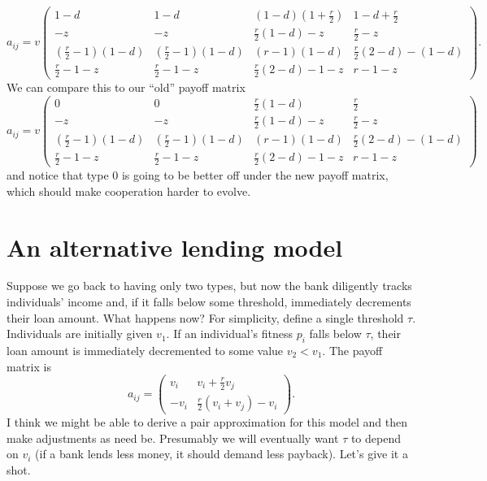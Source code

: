 \documentclass[13pt]{amsart}
\begin{document}
\begin{equation}
    a_{ij} = v
    \begin{pmatrix}
        1-d & 1-d & (1-d)(1+\frac{r}{2}) & 1-d + \frac{r}{2} \\
        -z & -z & \frac{r}{2}(1-d) -z & \frac{r}{2} -z \\
        (\frac{r}{2} - 1)(1-d) & (\frac{r}{2} - 1)(1-d) & (r-1)(1-d)& \frac{r}{2}(2 - d) - (1-d)\\
        \frac{r}{2} - 1 - z & \frac{r}{2} - 1 - z & \frac{r}{2}(2 - d) - 1 - z & r - 1 -z
    \end{pmatrix}.
\end{equation}
We can compare this to our ``old'' payoff matrix \begin{equation}
    a_{ij} = v
    \begin{pmatrix}
        0 & 0 & \frac{r}{2}(1-d) & \frac{r}{2} \\
        -z & -z & \frac{r}{2}(1-d) -z & \frac{r}{2} -z \\
        (\frac{r}{2} - 1)(1-d) & (\frac{r}{2} - 1)(1-d) & (r-1)(1-d)& \frac{r}{2}(2 - d) - (1-d)\\
        \frac{r}{2} - 1 - z & \frac{r}{2} - 1 -z & \frac{r}{2}(2 - d) - 1 - z & r - 1 -z
    \end{pmatrix}
\end{equation}
and notice that type $0$ is going to be better off under the new payoff matrix, which should make cooperation harder to evolve.

\section{An alternative lending model}

Suppose we go back to having only two types, but now the bank diligently tracks individuals' income and, if it falls below some threshold, immediately decrements their loan amount.
What happens now?
For simplicity, define a single threshold $\tau$.
Individuals are initially given $v_1$.
If an individual's fitness $p_i$ falls below $\tau$, their loan amount is immediately decremented to some value $v_2 < v_1$.
The payoff matrix is
\begin{equation}
    a_{ij} =
    \begin{pmatrix}
        v_i & v_i + \frac{r}{2} v_j \\
        -v_i & \frac{r}{2}(v_i + v_j) - v_i
    \end{pmatrix}.
\end{equation}
I think we might be able to derive a pair approximation for this model and then make adjustments as need be.
Presumably we will eventually want $\tau$ to depend on $v_i$ (if a bank lends less money, it should demand less payback).
Let's give it a shot.
\end{document}
